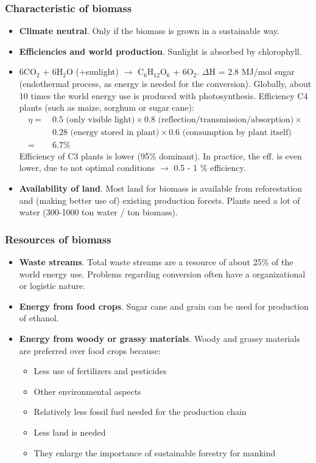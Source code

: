 \documentclass[a4paper,10pt]{article}
\begin{document}
\subsubsection{Characteristic of biomass}
\begin{itemize}
 \item \textbf{Climate neutral}. Only if the biomass is grown in a sustainable way.
 \item \textbf{Efficiencies and world production}. Sunlight is absorbed by chlorophyll.
 \item 6CO$_2$ + 6H$_2$O (+sunlight) $\rightarrow$ C$_6$H$_{12}$O$_6$ + 6O$_2$. $\Delta$H = 2.8 MJ/mol sugar (endothermal process, as energy is needed for the conversion). Globally, about 10 times the world energy use is produced with photosynthesis. Efficiency C4 plants (such as maize, sorghum or sugar cane):
 \begin{align*}
  \eta =\ & 0.5 \text{ (only visible light)} \times 0.8 \text{ (reflection/transmission/absorption)} \times\\
  & 0.28 \text{ (energy stored in plant)} \times 0.6 \text{ (consumption by plant itself)} \\
  =\ & 6.7\%
 \end{align*}
 Efficiency of C3 plants is lower (95\% dominant). In practice, the eff. is even lower, due to not optimal conditions $\rightarrow$ 0.5 - 1 \% efficiency.
 \item \textbf{Availability of land}. Most land for biomass is available from reforestation and (making better use of) existing production forests. Plants need a lot of water (300-1000 ton water / ton biomass).
\end{itemize}

\subsubsection{Resources of biomass}
\begin{itemize}
 \item \textbf{Waste streams}. Total waste streams are a resource of about 25\% of the world energy use. Problems regarding conversion often have a organizational or logistic nature.
 \item \textbf{Energy from food crops}. Sugar cane and grain can be used for production of ethanol.
 \item \textbf{Energy from woody or grassy materials}. Woody and grassy materials are preferred over food crops because:
 \begin{itemize}
 \item Less use of fertilizers and pesticides
 \item Other environmental aspects
 \item Relatively less fossil fuel needed for the production chain
 \item Less land is needed
 \item They enlarge the importance of sustainable forestry for mankind
 \end{itemize}
\end{itemize}
\end{document}
